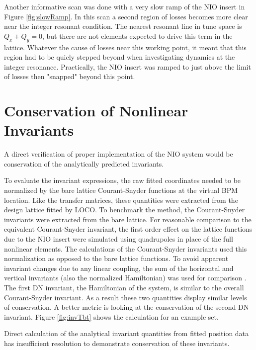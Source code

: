 Another informative scan was done with a very slow ramp of the NIO insert in Figure \ref{fig:slowRamp}. In this scan a second region of losses becomes more clear near the integer resonant condition. The nearest resonant line in tune space is $Q_x + Q_y = 0$, but there are not elements expected to drive this term in the lattice. Whatever the cause of losses near this working point, it meant that this region had to be quicly stepped beyond when investigating dynamics at the integer resonance. Practically, the NIO insert was ramped to just above the limit of losses then "snapped" beyond this point.

\section{Conservation of Nonlinear Invariants} \label{sec:invConv}
A direct verification of proper implementation of the NIO system would be conservation of the analytically predicted invariants.

To evaluate the invariant expressions, the raw fitted coordinates needed to be normalized by the bare lattice Courant-Snyder functions at the virtual BPM location. Like the transfer matrices, these quantities were extracted from the design lattice fitted by LOCO. To benchmark the method, the Courant-Snyder invariants were extracted from the bare lattice. For reasonable comparison to the equivalent Courant-Snyder invariant, the first order effect on the lattice functions due to the NIO insert were simulated using quadrupoles in place of the full nonlinear elements. The calculations of the Courant-Snyder invariants used this normalization as opposed to the bare lattice functions. To avoid apparent invariant changes due to any linear coupling, the sum of the horizontal and vertical invariants (also the normalized Hamiltonian) was used for comparison \cite{leeAccelerator}. The first DN invariant, the Hamiltonian of the system, is similar to the overall Courant-Snyder invariant. As a result these two quantities display similar levels of conservation. A better metric is looking at the conservation of the second DN invariant. Figure \ref{fig:invTbt} shows the calculation for an example set.



Direct calculation of the analytical invariant quantities from fitted position data has insufficient resolution to demonstrate conservation of these invariants.

